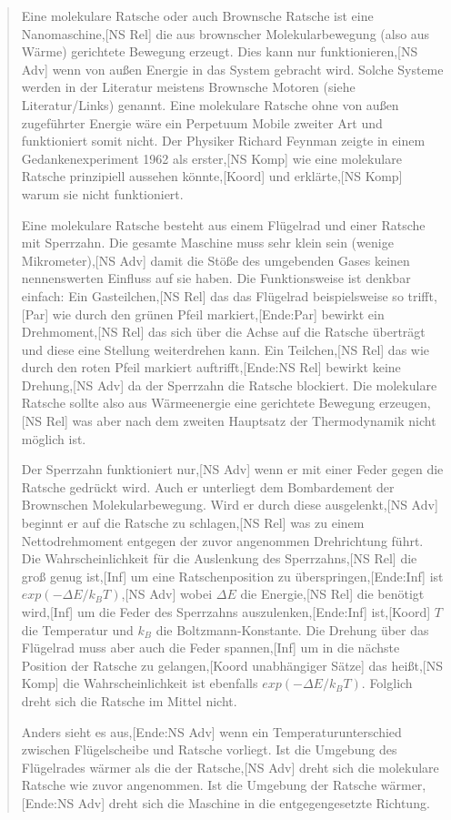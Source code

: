 \begin{sloppypar}
\begin{quote}
Eine molekulare Ratsche oder auch Brownsche Ratsche ist eine Nanomaschine,[NS Rel] die aus brownscher Molekularbewegung (also aus Wärme) gerichtete Bewegung erzeugt.
Dies kann nur funktionieren,[NS Adv] wenn von außen Energie in das System gebracht wird.
Solche Systeme werden in der Literatur meistens Brownsche Motoren (siehe Literatur/Links) genannt.
Eine molekulare Ratsche ohne von außen zugeführter Energie wäre ein Perpetuum Mobile zweiter Art und funktioniert somit nicht.
Der Physiker Richard Feynman zeigte in einem Gedankenexperiment 1962 als erster,[NS Komp] wie eine molekulare Ratsche prinzipiell aussehen könnte,[Koord] und erklärte,[NS Komp] warum sie nicht funktioniert.

Eine molekulare Ratsche besteht aus einem Flügelrad und einer Ratsche mit Sperrzahn.
Die gesamte Maschine muss sehr klein sein (wenige Mikrometer),[NS Adv] damit die Stöße des umgebenden Gases keinen nennenswerten Einfluss auf sie haben.
Die Funktionsweise ist denkbar einfach:
Ein Gasteilchen,[NS Rel] das das Flügelrad beispielsweise so trifft,[Par] wie durch den grünen Pfeil markiert,[Ende:Par] bewirkt ein Drehmoment,[NS Rel] das sich über die Achse auf die Ratsche überträgt und diese eine Stellung weiterdrehen kann.
Ein Teilchen,[NS Rel] das wie durch den roten Pfeil markiert auftrifft,[Ende:NS Rel] bewirkt keine Drehung,[NS Adv] da der Sperrzahn die Ratsche blockiert.
Die molekulare Ratsche sollte also aus Wärmeenergie eine gerichtete Bewegung erzeugen,[NS Rel] was aber nach dem zweiten Hauptsatz der Thermodynamik nicht möglich ist.

Der Sperrzahn funktioniert nur,[NS Adv] wenn er mit einer Feder gegen die Ratsche gedrückt wird.
Auch er unterliegt dem Bombardement der Brownschen Molekularbewegung.
Wird er durch diese ausgelenkt,[NS Adv] beginnt er auf die Ratsche zu schlagen,[NS Rel] was zu einem Nettodrehmoment entgegen der zuvor angenommen Drehrichtung führt.
Die Wahrscheinlichkeit für die Auslenkung des Sperrzahns,[NS Rel] die groß genug ist,[Inf] um eine Ratschenposition zu überspringen,[Ende:Inf] ist $exp(-\Delta E/k_BT)$,[NS Adv] wobei $\Delta E$ die Energie,[NS Rel] die benötigt wird,[Inf] um die Feder des Sperrzahns auszulenken,[Ende:Inf] ist,[Koord] $T$ die Temperatur und $k_B$ die Boltzmann-Konstante.
Die Drehung über das Flügelrad muss aber auch die Feder spannen,[Inf] um in die nächste Position der Ratsche zu gelangen,[Koord unabhängiger Sätze] das heißt,[NS Komp] die Wahrscheinlichkeit ist ebenfalls $exp(-\Delta E/k_BT)$.
Folglich dreht sich die Ratsche im Mittel nicht.

Anders sieht es aus,[Ende:NS Adv] wenn ein Temperaturunterschied zwischen Flügelscheibe und Ratsche vorliegt.
Ist die Umgebung des Flügelrades wärmer als die der Ratsche,[NS Adv] dreht sich die molekulare Ratsche wie zuvor angenommen.
Ist die Umgebung der Ratsche wärmer,[Ende:NS Adv] dreht sich die Maschine in die entgegengesetzte Richtung.
\end{quote}
\end{sloppypar}

